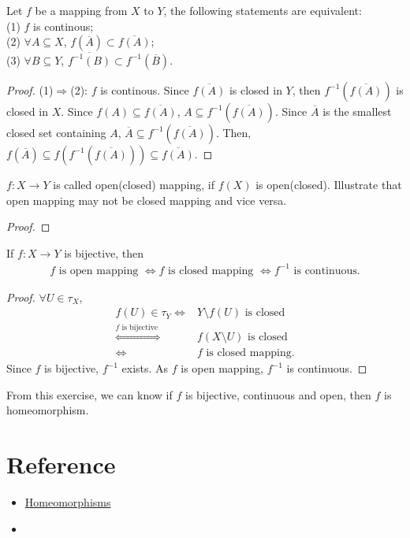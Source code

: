 \begin{exercise}{}{}
    Let $f$ be a mapping from $X$ to $Y$, the following statements are equivalent:\\
    (1) $f$ is continous;\\
    (2) $\forall A\subseteq X$, $f(\overline{A})\subset \overline{f(A)}$;\\
    (3) $\forall B\subseteq Y$, $\overline{f^{-1}(B)}\subset f^{-1}(\overline{B})$.
\end{exercise}

\begin{proof}
    (1)$\Rightarrow$(2): $f$ is continous. Since $\overline{f(A)}$ is closed in $Y$, 
    then $f^{-1}(\overline{f(A)})$ is closed in $X$. Since $f(A)\subseteq \overline{f(A)}$, 
    $A\subseteq f^{-1}(\overline{f(A)})$. Since $\overline{A}$ is the smallest closed set containing $A$, 
    $\overline{A}\subseteq f^{-1}(\overline{f(A)})$. Then, $f(\overline{A})\subseteq f(f^{-1}(\overline{f(A)}))\subseteq \overline{f(A)}$.

\end{proof}

\begin{exercise}{}{}
    $f:X\rightarrow Y$ is called open(closed) mapping, if $f(X)$ is open(closed). 
    Illustrate that open mapping may not be closed mapping and vice versa.
\end{exercise}
\begin{proof}
    
\end{proof}

\begin{exercise}
    If $f:X\rightarrow Y$ is bijective, then
    \begin{align*}
        f \text{ is open mapping }\Leftrightarrow f\text{ is closed mapping }\Leftrightarrow f^{-1} \text{ is continuous}.
    \end{align*}
\end{exercise}

\begin{proof}
    $\forall U\in\tau_X$,
    \begin{align*}
        f(U)\in \tau_Y \Leftrightarrow & Y\setminus f(U) \text{ is closed }\\
                                \overset{f \text{ is bijective }}{\Leftrightarrow} & f(X\setminus U) \text{ is closed } \\
                                \Leftrightarrow & f \text{ is closed mapping}.
    \end{align*}
    Since $f$ is bijective, $f^{-1}$ exists. As $f$ is open mapping, $f^{-1}$ is continuous.
\end{proof}

\begin{remark}
    From this exercise, we can know if $f$ is bijective, continuous and open, then $f$ is homeomorphism.
\end{remark}

\section{Reference}

\begin{itemize}
    \item \href{https://raphaeltinarrage.github.io/files/EMAp/Lesson2.pdf}{Homeomorphisms}
    \item 
\end{itemize}


